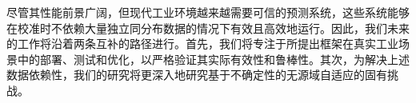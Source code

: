 \documentclass[UTF8,journal,twoside,web]{ieeecolor}
\newcommand{\newtext}[1]{{\leavevmode\color{blue}#1}}
\begin{document}
\newtext{尽管其性能前景广阔，但现代工业环境越来越需要可信的预测系统，这些系统能够在校准时不依赖大量独立同分布数据的情况下有效且高效地运行。因此，我们未来的工作将沿着两条互补的路径进行。首先，我们将专注于所提出框架在真实工业场景中的部署、测试和优化，以严格验证其实际有效性和鲁棒性。其次，为解决上述数据依赖性，我们的研究将更深入地研究基于不确定性的无源域自适应的固有挑战。}




    
\end{document}
